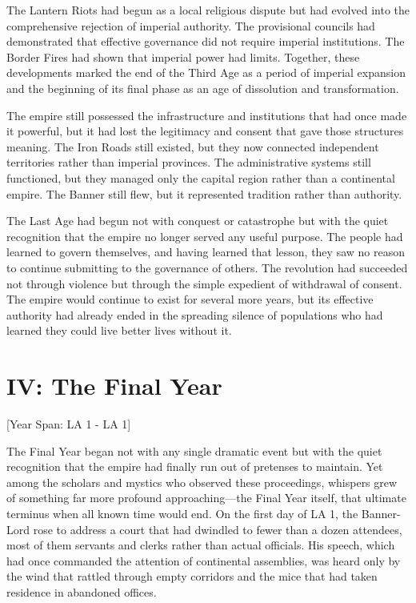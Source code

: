 The Lantern Riots had begun as a local religious dispute but had evolved
into the comprehensive rejection of imperial authority. The provisional
councils had demonstrated that effective governance did not require
imperial institutions. The Border Fires had shown that imperial power
had limits. Together, these developments marked the end of the Third Age
as a period of imperial expansion and the beginning of its final phase
as an age of dissolution and transformation.

The empire still possessed the infrastructure and institutions that had
once made it powerful, but it had lost the legitimacy and consent that
gave those structures meaning. The Iron Roads still existed, but they
now connected independent territories rather than imperial provinces.
The administrative systems still functioned, but they managed only the
capital region rather than a continental empire. The Banner still flew,
but it represented tradition rather than authority.

The Last Age had begun not with conquest or catastrophe but with the
quiet recognition that the empire no longer served any useful purpose.
The people had learned to govern themselves, and having learned that
lesson, they saw no reason to continue submitting to the governance of
others. The revolution had succeeded not through violence but through
the simple expedient of withdrawal of consent. The empire would continue
to exist for several more years, but its effective authority had already
ended in the spreading silence of populations who had learned they could
live better lives without it.

\chapter{IV: The Final Year}\label{arc-iv-the-final-year}

{[}Year Span: LA 1 - LA 1{]}

The Final Year began not with any single dramatic event but with the
quiet recognition that the empire had finally run out of pretenses to
maintain. Yet among the scholars and mystics who observed these
proceedings, whispers grew of something far more profound
approaching---the Final Year itself, that ultimate terminus when all
known time would end. On the first day of LA 1, the Banner-Lord rose to
address a court that had dwindled to fewer than a dozen attendees, most
of them servants and clerks rather than actual officials. His speech,
which had once commanded the attention of continental assemblies, was
heard only by the wind that rattled through empty corridors and the mice
that had taken residence in abandoned offices.

